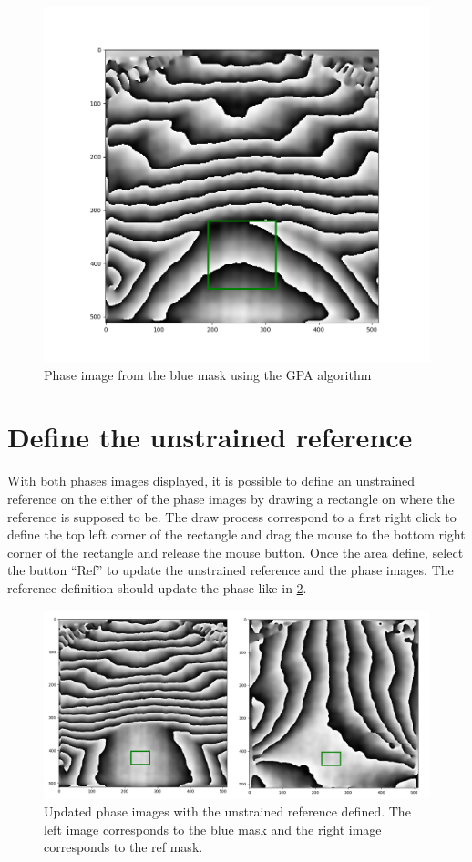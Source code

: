 \documentclass[12pt, titlepage]{article}
\begin{document}
\begin{figure}[H]
\centering
\includegraphics[scale=0.5]{Figures/GPA_-_Mask_Blue.png}
\caption{Phase image from the blue mask using the GPA algorithm}
\label{fig:GPA_Mask_Blue}
\end{figure}

\section{Define the unstrained reference}

With both phases images displayed, it is possible to define an unstrained reference on the either of the phase images by drawing a rectangle on where the reference is supposed to be. The draw process correspond to a first right click to define the top left corner of the rectangle and drag the mouse to the bottom right corner of the rectangle and release the mouse button. Once the area define, select the button \enquote{Ref} to update the unstrained reference and the phase images. The reference definition should update the phase like in \cref{fig:GPA_Mask_Ref_Updated}.

\begin{figure}[H]
\centering
\includegraphics[scale=0.4]{Figures/GPA_-_Both_Phases.png}
\caption{Updated phase images with the unstrained reference defined. The left image corresponds to the blue mask and the right image corresponds to the ref mask.}
\label{fig:GPA_Mask_Ref_Updated}
\end{figure}
\end{document}
